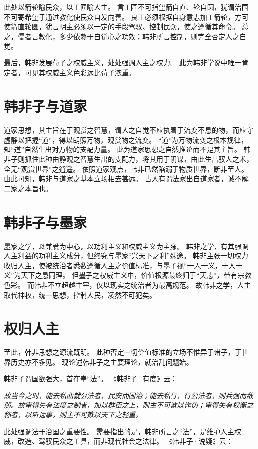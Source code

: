 \documentclass[11pt]{article}
\begin{document}
此处以箭轮喻民众，以工匠喻人主。
言工匠不可指望箭自直、轮自圆，犹谓治国不可寄希望于通过教化使民众自发向善。
良工必须根据自身意志加工箭轮，方可使箭直轮圆，犹言明主必须以一定的手段驾驭、控制民众，使之遵循其命令。
总之，儒者言教化，多少依赖于自觉心之功效；韩非所言控制，则完全否定人之自觉。

\newline
最后，韩非发展荀子之权威主义，处处强调人主之权力。
此为韩非学说中唯一肯定者，可见其权威主义色彩远比荀子浓重。
  
\section{韩非子与道家}
道家思想，其主旨在于观赏之智慧，谓人之自觉不应执着于流变不息的物，而应守虚静以把握“道”，得以朗照万物，观赏物之流变。
“道”为万物流变之根本规律，知“道”自然生出对万物的支配力量。
此为道家思想之自然推论而不是其主旨。
韩非子则抓住此种由静观之智慧生出的支配力，将其用于阴谋，由此生出驭人之术，全无“观赏世界”之逍遥。
依照道家观点，韩非已然陷溺于物质世界，断非至人。
由此可知，韩非与道家之基本立场相去甚远。
古人有谓法家出自道家者，诚不解二家之本旨也。
  
\section{韩非子与墨家}
墨家之学，以兼爱为中心，以功利主义和权威主义为主脉。
韩非之学，有其强调人主利益的功利主义成分，但终究与墨家“兴天下之利”殊途。
韩非主张一切权力收归人主，使被统治者悉数遵循人主之价值标准，与墨子视“一人一义，十人十义”为天下之患同理。
但墨子之权威主义中，价值根源最终归于“天志”，带有宗教色彩。
而韩非不立超越主宰，仅以现实之统治者为最高规范。
故韩非之学，人主取代神权，统一思想，控制人民，凌然不可犯矣。
  
\section{权归人主}
至此，韩非思想之源流既明。
此种否定一切价值标准的立场不惟异于诸子，于世界历史亦不多见。
现论述韩非子之主要理论，就治乱问题始。

\newline

韩非子谓国欲强大，首在奉“法”。
《韩非子·有度》云：

\textit{故当今之时，能去私曲就公法者，民安而国治；能去私行，行公法者，则兵强而敌弱。故审得失有法度之制者，加以群臣之上，则主不可欺以诈伪；审得失有权衡之称者，以听远事，则主不可欺以天下之轻重。}

此处强调法于治国之重要性。
需要指出的是，韩非所言之“法”，是维护人主权威，改造、驾驭民众之工具，而非现代社会之法律。
《韩非子·说疑》云：
\end{document}
